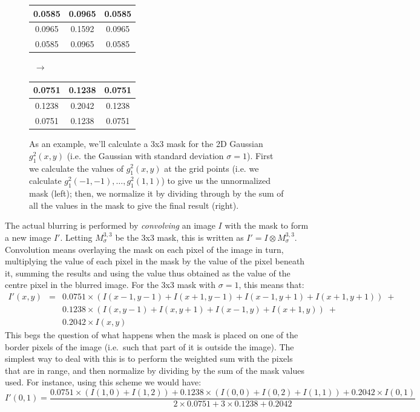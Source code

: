 \begin{figure}[p]
\begin{center}
\begin{tabular}{|c|c|c|}
\hline
0.0585 & 0.0965 & 0.0585 \\
\hline
0.0965 & 0.1592 & 0.0965 \\
\hline
0.0585 & 0.0965 & 0.0585 \\
\hline
\end{tabular}%
$\;\; \longrightarrow \;\;$%
\begin{tabular}{|c|c|c|}
\hline
0.0751 & 0.1238 & 0.0751 \\
\hline
0.1238 & 0.2042 & 0.1238 \\
\hline
0.0751 & 0.1238 & 0.0751 \\
\hline
\end{tabular}
\end{center}
\caption{As an example, we'll calculate a 3x3 mask for the 2D Gaussian $g_1^2(x,y)$ (i.e. the Gaussian with standard deviation $\sigma = 1$). First we calculate the values of $g_1^2(x,y)$ at the grid points (i.e. we calculate $g_1^2(-1,-1), \ldots, g_1^2(1,1)$) to give us the unnormalized mask (left); then, we normalize it by dividing through by the sum of all the values in the mask to give the final result (right).}
\label{fig:segmentation-watershed-gaussianmask}
\end{figure}


The actual blurring is performed by \emph{convolving} an image $I$ with the mask to form a new image $I'$. Letting $M_\sigma^{3,3}$ be the 3x3 mask, this is written as $I' = I \otimes M_\sigma^{3,3}$. Convolution means overlaying the mask on each pixel of the image in turn, multiplying the value of each pixel in the mask by the value of the pixel beneath it, summing the results and using the value thus obtained as the value of the centre pixel in the blurred image. For the 3x3 mask with $\sigma = 1$, this means that:
%
\begin{eqnarray*}
I'(x,y)
& = & 0.0751 \times (I(x-1,y-1) + I(x+1,y-1) + I(x-1,y+1) + I(x+1,y+1)) \; + \\
&   & 0.1238 \times (I(x,y-1) + I(x,y+1) + I(x-1,y) + I(x+1,y)) \; + \\
&   & 0.2042 \times I(x,y)
\end{eqnarray*}
%
This begs the question of what happens when the mask is placed on one of the border pixels of the image (i.e.~such that part of it is outside the image). The simplest way to deal with this is to perform the weighted sum with the pixels that are in range, and then normalize by dividing by the sum of the mask values used. For instance, using this scheme we would have:
%
\[
I'(0,1) = \frac{0.0751 \times (I(1,0) + I(1,2)) + 0.1238 \times (I(0,0) + I(0,2) + I(1,1)) + 0.2042 \times I(0,1)}{2 \times 0.0751 + 3 \times 0.1238 + 0.2042}
\]

